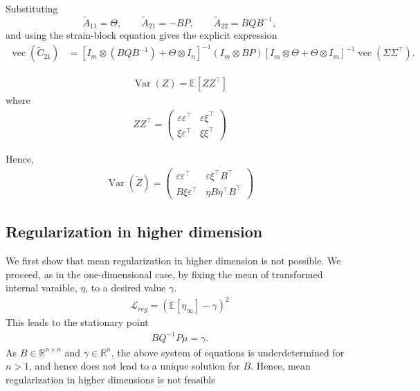 \documentclass[11pt]{article}
\begin{document}
Substituting
\begin{equation}
    \widetilde{A}_{11}=\Theta,
    \qquad \widetilde{A}_{21}=-BP,
    \qquad \widetilde{A}_{22}=BQB^{-1},
\end{equation}
and using the strain-block equation gives the explicit expression
\begin{equation}
    \begin{aligned}
        \operatorname{vec}(\widetilde{C}_{21})
         & =\left[I_m\otimes(BQB^{-1})+\Theta\otimes I_n\right]^{-1}
        (I_m\otimes BP)
        \left[I_m\otimes\Theta+\Theta\otimes I_m\right]^{-1}
        \operatorname{vec}(\Sigma\Sigma^{\top}).
    \end{aligned}
\end{equation}

\begin{align}
    \operatorname{Var}(Z) = \mathbb{E}[Z Z^\top]
\end{align}
where
\begin{align}
    ZZ^\top = \begin{pmatrix}
                  \varepsilon \varepsilon^\top & \varepsilon \xi^\top \\
                  \xi \varepsilon^\top         & \xi \xi^\top
              \end{pmatrix}
\end{align}

Hence,
\begin{align}
    \operatorname{Var}(\widetilde{Z}) = \begin{pmatrix}
                                            \varepsilon \varepsilon^\top & \varepsilon \xi^\top B^\top \\
                                            B \xi \varepsilon^\top       & \eta B\eta^\top B^\top
                                        \end{pmatrix}
\end{align}
\subsection{Regularization in higher dimension}
We first show that mean regularization in higher dimension is not possible. We proceed, as in the one-dimensional case, by fixing the mean of transformed internal varaible, $\eta$, to a desired value $\gamma$.
\begin{align}
    \mathcal{L}_{reg} = (\mathbb{E}[\eta_\infty] - \gamma)^2
\end{align}
This leads to the stationary point
\begin{align}
    BQ^{-1}P\mu = \gamma.
\end{align}
As $B \in \mathbb{R}^{n \times n}$ and $\gamma \in  \mathbb{R}^{n}$, the above system of equations is underdetermined for $n > 1$, and hence does not lead to a unique solution for $B$. Hence, mean regularization in higher dimensions is not feasible
\end{document}

